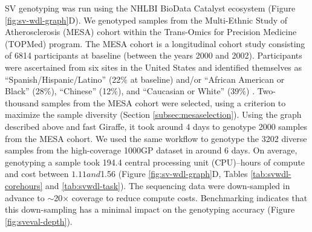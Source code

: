 \documentclass[11pt]{ucscthesis}
\begin{document}
SV genotyping was run using the NHLBI BioData Catalyst ecosystem \cite{bdc2020} (Figure \ref{fig:sv-wdl-graph}D).
We genotyped samples from the Multi-Ethnic Study of Atherosclerosis (MESA) cohort within the Trans-Omics for Precision Medicine (TOPMed) program.
The MESA cohort is a longitudinal cohort study consisting of 6814 participants at baseline (between the years 2000 and 2002).
Participants were ascertained from six sites in the United States and identified themselves as “Spanish/Hispanic/Latino” (22$\%$ at baseline) and/or “African American or Black” (28$\%$), “Chinese” (12$\%$), and “Caucasian or White” (39$\%$) \cite{mesa_2008}. Two-thousand samples from the MESA cohort \cite{mesa_2008} were selected, using a criterion to maximize the sample diversity (Section \ref{subsec:mesaselection}).
Using the graph described above and fast Giraffe, it took around 4 days to genotype 2000 samples from the MESA cohort.
We used the same workflow to genotype the 3202 diverse samples from the high-coverage 1000GP dataset \cite{1000gp_nygc_2021} in around 6 days.
On average, genotyping a sample took 194.4 central processing unit (CPU)–hours of compute and cost between $1.11 and $1.56 (Figure \ref{fig:sv-wdl-graph}D, Tables \ref{tab:svwdl-corehours} and \ref{tab:svwdl-task}).
The sequencing data were down-sampled in advance to $\sim$20× coverage to reduce compute costs.
Benchmarking indicates that this down-sampling has a minimal impact on the genotyping accuracy (Figure \ref{fig:sveval-depth}).
\end{document}
